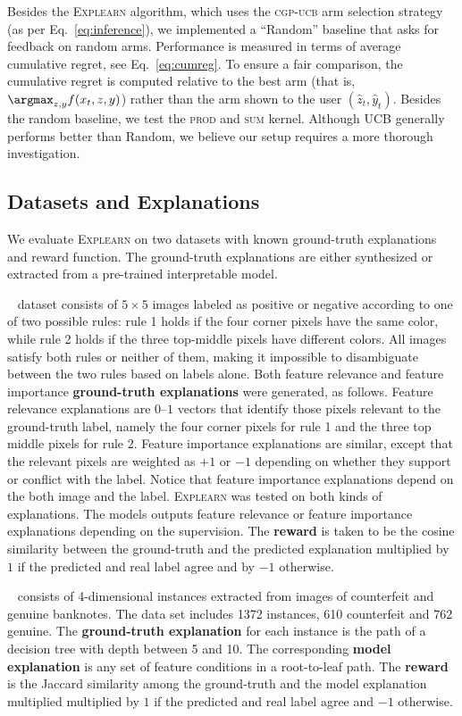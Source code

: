 \documentclass[letterpaper]{article} %
\newcommand{\explearn}{\textsc{Explearn}\xspace}
\newcommand{\cgpucb}{\textsc{cgp-ucb}\xspace}
\begin{document}
 Besides the \explearn algorithm, which uses the \cgpucb arm selection strategy (as per Eq.~\ref{eq:inference}), we implemented a ``Random'' baseline that asks for feedback on random arms.  Performance is measured in terms of average cumulative regret, see Eq.~\ref{eq:cumreg}.  To ensure a fair comparison, the cumulative regret is computed relative to the best arm (that is, $\argmax_{z,y} f(x_t, z, y)$) rather than the arm shown to the user $(\hat{z}_t, \hat{y}_t)$.  Besides the random baseline, we test the \textsc{prod} and \textsc{sum} kernel. Although UCB generally performs better than Random, we believe our setup requires a more thorough investigation.


\subsection{Datasets and Explanations}

We evaluate \explearn on two datasets with known ground-truth explanations and reward function. The ground-truth explanations are either synthesized or extracted from a pre-trained interpretable model.

~\cite{ross2017right} dataset consists of $5{\times}5$ images labeled as positive or negative according to one of two possible rules:  rule 1 holds if the four corner pixels have the same color, while rule 2 holds if the three top-middle pixels have different colors.  All images satisfy both rules or neither of them, making it impossible to disambiguate between the two rules based on labels alone.  Both feature relevance and feature importance \textbf{ground-truth explanations} were generated, as follows.  Feature relevance explanations are $0$--$1$ vectors that identify those pixels relevant to the ground-truth label, namely the four corner pixels for rule 1 and the three top middle pixels for rule 2.  Feature importance explanations are similar, except that the relevant pixels are weighted as $+1$ or $-1$ depending on whether they support or conflict with the label.  Notice that feature importance explanations depend on the both image and the label.  \explearn was tested on both kinds of explanations.  The models outputs feature relevance or feature importance explanations depending on the supervision.  The \textbf{reward} is taken to be the cosine similarity between the ground-truth and the predicted explanation multiplied by $1$ if the predicted and real label agree and by $-1$ otherwise.

~\cite{dua2019uci} consists of 4-dimensional instances extracted from images of counterfeit and genuine banknotes.  The data set includes 1372 instances, 610 counterfeit and 762 genuine. The \textbf{ground-truth explanation} for each instance is the path of a decision tree with depth between 5 and 10. The corresponding \textbf{model explanation} is any set of feature conditions in a root-to-leaf path.  The \textbf{reward} is the Jaccard similarity among the ground-truth and the model explanation multiplied multiplied by $1$ if the predicted and real label agree and $-1$ otherwise.
\end{document}
